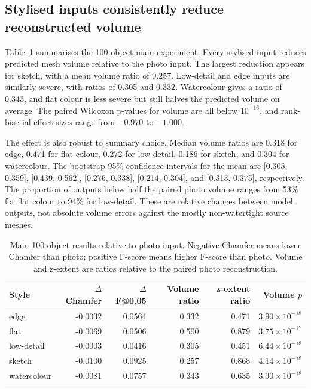 \documentclass[12pt,a4paper]{article}
\begin{document}
\subsection{Stylised inputs consistently reduce reconstructed volume}

Table~\ref{tab:main100} summarises the 100-object main experiment. Every stylised input reduces predicted mesh volume relative to the photo input. The largest reduction appears for sketch, with a mean volume ratio of 0.257. Low-detail and edge inputs are similarly severe, with ratios of 0.305 and 0.332. Watercolour gives a ratio of 0.343, and flat colour is less severe but still halves the predicted volume on average. The paired Wilcoxon p-values for volume are all below $10^{-16}$, and rank-biserial effect sizes range from $-0.970$ to $-1.000$.

The effect is also robust to summary choice. Median volume ratios are 0.318 for edge, 0.471 for flat colour, 0.272 for low-detail, 0.186 for sketch, and 0.304 for watercolour. The bootstrap 95\% confidence intervals for the mean are [0.305, 0.359], [0.439, 0.562], [0.276, 0.338], [0.214, 0.304], and [0.313, 0.375], respectively. The proportion of outputs below half the paired photo volume ranges from 53\% for flat colour to 94\% for low-detail. These are relative changes between model outputs, not absolute volume errors against the mostly non-watertight source meshes.

\begin{table}[!ht]
\caption{Main 100-object results relative to photo input. Negative Chamfer means lower Chamfer than photo; positive F-score means higher F-score than photo. Volume and z-extent are ratios relative to the paired photo reconstruction.}
\label{tab:main100}
\centering
\begin{tabular}{lrrrrr}
\toprule
Style & $\Delta$ Chamfer & $\Delta$ F@0.05 & Volume ratio & z-extent ratio & Volume $p$ \\
\midrule
edge & -0.0032 & 0.0564 & 0.332 & 0.471 & $3.90\times10^{-18}$ \\
flat & -0.0069 & 0.0506 & 0.500 & 0.879 & $3.75\times10^{-17}$ \\
low-detail & -0.0003 & 0.0416 & 0.305 & 0.451 & $6.44\times10^{-18}$ \\
sketch & -0.0100 & 0.0925 & 0.257 & 0.868 & $4.14\times10^{-18}$ \\
watercolour & -0.0081 & 0.0757 & 0.343 & 0.635 & $3.90\times10^{-18}$ \\
\bottomrule
\end{tabular}
\end{table}
\end{document}

